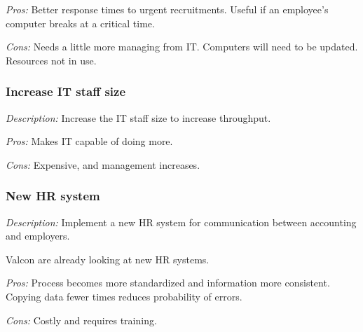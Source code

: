\noindent \emph{Pros:} Better response times to urgent recruitments. Useful if an employee's computer breaks at a critical time.

\noindent \emph{Cons:} Needs a little more managing from IT. Computers will need to be updated. Resources not in use.

\subsubsection{Increase IT staff size}
\emph{Description:} Increase the IT staff size to increase throughput.

\noindent \emph{Pros:} Makes IT capable of doing more.

\noindent \emph{Cons:} Expensive, and management increases.

\subsubsection{New HR system}
\emph{Description:} Implement a new HR system for communication between accounting and employers.

Valcon are already looking at new HR systems.

\noindent \emph{Pros:} Process becomes more standardized and information more consistent. Copying data fewer times reduces probability of errors.

\noindent \emph{Cons:} Costly and requires training.

